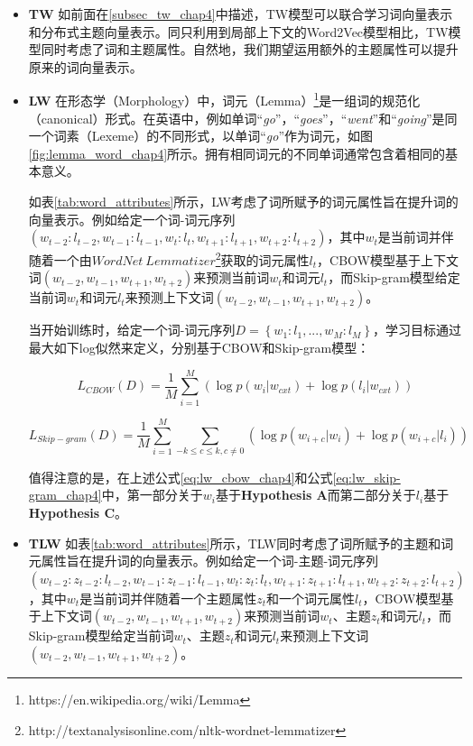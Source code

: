 \documentclass[master]{njuthesis}
\begin{document}
\begin{itemize}
\item \textbf{TW} 如前面在\ref{subsec_tw_chap4}中描述，TW模型可以联合学习词向量表示和分布式主题向量表示。同只利用到局部上下文的Word2Vec模型相比，TW模型同时考虑了词和主题属性。自然地，我们期望运用额外的主题属性可以提升原来的词向量表示。

\item \textbf{LW} 在形态学（Morphology）中，词元（Lemma）\footnote{https://en.wikipedia.org/wiki/Lemma}是一组词的规范化（canonical）形式。在英语中，例如单词``{\it go}''，``{\it goes}''，``{\it went}''和``{\it going}''是同一个词素（Lexeme）的不同形式，以单词``{\it go}''作为词元，如图\ref{fig:lemma_word_chap4}所示。拥有相同词元的不同单词通常包含着相同的基本意义。

如表\ref{tab:word_attributes}所示，LW考虑了词所赋予的词元属性旨在提升词的向量表示。例如给定一个词-词元序列$(w_{t-2}:l_{t-2}, w_{t-1}:l_{t-1}, w_t:l_t, w_{t+1}:l_{t+1}, w_{t+2}:l_{t+2})$，其中$w_t$是当前词并伴随着一个由$WordNet\ Lemmatizer$\footnote{http://textanalysisonline.com/nltk-wordnet-lemmatizer}获取的词元属性$l_t$，CBOW模型基于上下文词$(w_{t-2}, w_{t-1}, w_{t+1}, w_{t+2})$来预测当前词$w_t$和词元$l_t$，而Skip-gram模型给定当前词$w_t$和词元$l_t$来预测上下文词$(w_{t-2}, w_{t-1}, w_{t+1}, w_{t+2})$。

当开始训练时，给定一个词-词元序列$D=\left \{w_{1}:l_{1},...,w_{M}:l_{M}  \right \}$，学习目标通过最大如下log似然来定义，分别基于CBOW和Skip-gram模型：

	\begin{equation}\label{eq:lw_cbow_chap4}
	{L}_{CBOW}(D)=\frac{1}{M}\sum_{i=1}^{M}(\log p(w_{i}|w_{cxt})+\log p(l_{i}|w_{cxt}))
	\end{equation}
	
	\begin{equation}\label{eq:lw_skip-gram_chap4}
	{L}_{Skip-gram}(D)=\frac{1}{M}\sum_{i=1}^{M}\sum_{-k\leq c\leq k,c\neq 0}(\log p(w_{i+c}|w_{i})+\log p(w_{i+c}|l_{i}))
	\end{equation}

值得注意的是，在上述公式\ref{eq:lw_cbow_chap4}和公式\ref{eq:lw_skip-gram_chap4}中，第一部分关于$w_i$基于\textbf{Hypothesis A}而第二部分关于$l_i$基于\textbf{Hypothesis C}。

\item \textbf{TLW} 如表\ref{tab:word_attributes}所示，TLW同时考虑了词所赋予的主题和词元属性旨在提升词的向量表示。例如给定一个词-主题-词元序列$(w_{t-2}:z_{t-2}:l_{t-2},w_{t-1}:z_{t-1}:l_{t-1},w_{t}:z_{t}:l_{t},w_{t+1}:z_{t+1}:l_{t+1},w_{t+2}:z_{t+2}:l_{t+2})$，其中$w_t$是当前词并伴随着一个主题属性$z_t$和一个词元属性$l_t$，CBOW模型基于上下文词$(w_{t-2}, w_{t-1}, w_{t+1}, w_{t+2})$来预测当前词$w_t$、主题$z_t$和词元$l_t$，而Skip-gram模型给定当前词$w_t$、主题$z_t$和词元$l_t$来预测上下文词$(w_{t-2}, w_{t-1}, w_{t+1}, w_{t+2})$。


\end{itemize}
\end{document}
